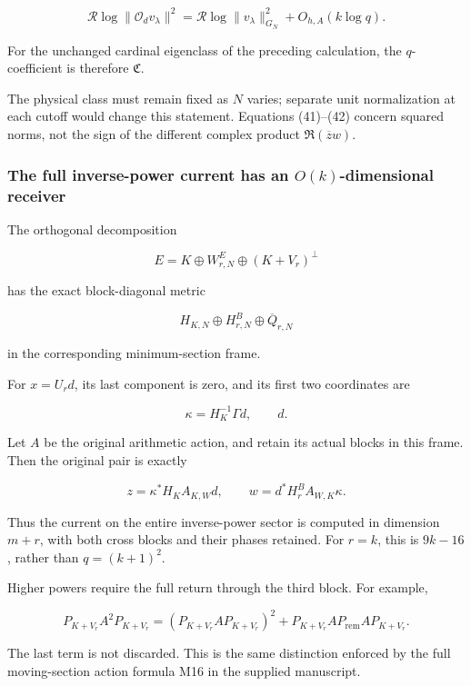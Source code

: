 \documentclass[11pt]{article}
\begin{document}
\[
\boxed{
\mathcal R\log\|\mathcal O_dv_\lambda\|^2
=
\mathcal R\log\|v_\lambda\|_{G_N}^2
+O_{h,A}(k\log q).
}
\tag{42}
\]

For the unchanged cardinal eigenclass of the preceding calculation, the \(q\)-coefficient is therefore \(\mathfrak C\).

The physical class must remain fixed as \(N\) varies; separate unit normalization at each cutoff would change this statement. Equations (41)--(42) concern squared norms, not the sign of the different complex product \(\Re(\overline zw)\).

\subsubsection{\texorpdfstring{The full inverse-power current has an \(O(k)\)-dimensional receiver}{The full inverse-power current has an O(k)-dimensional receiver}}\label{the-full-inverse-power-current-has-an-ok-dimensional-receiver}

The orthogonal decomposition

\[
E=K\oplus W^E_{r,N}\oplus(K+V_r)^\perp
\]

has the exact block-diagonal metric

\[
H_{K,N}\oplus H^B_{r,N}\oplus\overline Q_{r,N}
\]

in the corresponding minimum-section frame.

For \(x=U_rd\), its last component is zero, and its first two coordinates are

\[
\kappa=H_K^{-1}\Gamma d,\qquad d.
\]

Let \(A\) be the original arithmetic action, and retain its actual blocks in this frame. Then the original pair is exactly

\[
\boxed{
z=\kappa^*H_KA_{K,W}d,
\qquad
w=d^*H^B_rA_{W,K}\kappa.
}
\tag{43}
\]

Thus the current on the entire inverse-power sector is computed in dimension \(m+r\), with both cross blocks and their phases retained. For \(r=k\), this is \(9k-16\), rather than \(q=(k+1)^2\).

Higher powers require the full return through the third block. For example,

\[
P_{K+V_r}A^2P_{K+V_r}
=
(P_{K+V_r}AP_{K+V_r})^2
+
P_{K+V_r}AP_{\mathrm{rem}}AP_{K+V_r}.
\tag{44}
\]

The last term is not discarded. This is the same distinction enforced by the full moving-section action formula M16 in the supplied manuscript.
\end{document}

